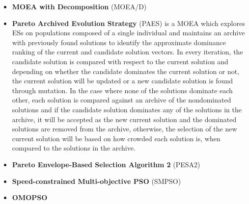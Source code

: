 \begin{itemize}
	\item \textbf{\ac{MOEA} with Decomposition} (MOEA/D)
	
	\item \textbf{Pareto Archived Evolution Strategy} (PAES) is a \ac{MOEA} which explores \acp{ES} on populations composed of a single individual and maintains an archive with previously found solutions to identify the approximate dominance ranking of the current and candidate solution vectors. In every iteration, the candidate solution is compared with respect to the current solution and depending on whether the candidate dominates the current solution or not, the current solution will be updated or a new candidate solution is found through mutation. In the case where none of the solutions dominate each other, each solution is compared against an archive of the nondominated solutions and if the candidate solution dominates any of the solutions in the archive, it will be accepted as the new current solution and the dominated solutions are removed from the archive, otherwise, the selection of the new current solution will be based on how crowded each solution is, when compared to the solutions in the archive. 
		
	\item \textbf{Pareto Envelope-Based Selection Algorithm 2} (PESA2)
	
	\item \textbf{Speed-constrained Multi-objective \ac{PSO}} (SMPSO)
	
	\item \textbf{OMOPSO}
	
\end{itemize}

